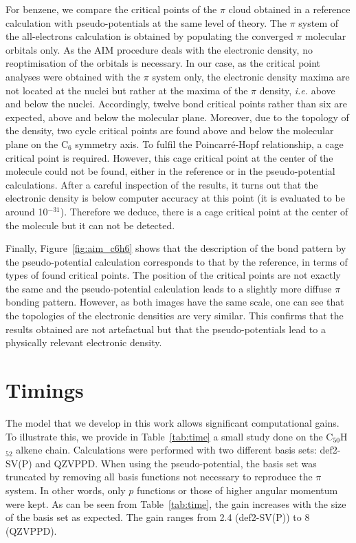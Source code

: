 \documentclass[12pt]{article}
\begin{document}
For benzene, we compare the critical points of the $\pi$ cloud obtained in a reference calculation
with pseudo-potentials at the same level of theory.
The $\pi$ system of the all-electrons calculation is obtained  by populating the converged $\pi$ molecular orbitals only.
As the AIM procedure deals with the electronic density, no reoptimisation of the orbitals is necessary.
In our case, as the critical point analyses were obtained
with the $\pi$ system only, the electronic density maxima are not
located at the nuclei but rather at the maxima of the $\pi$ density, 
\emph{i.e.} above and below the nuclei. %
Accordingly, twelve bond critical points rather than six are expected,
above and below the molecular plane.
Moreover, due to the topology of the density, two cycle critical points are found above and below the molecular
plane on the C$_6$ symmetry axis.
To fulfil the Poincarré-Hopf relationship, a cage critical point is required. However, this cage critical point 
at the center of the molecule could not be found, either in the reference or in the pseudo-potential 
calculations.
After a careful inspection of the results, it turns out that the electronic density
is below computer accuracy at this point (it is evaluated to be around 10$^{-31}$).
Therefore we deduce, there is a cage critical point at the center of
the molecule but it can not be detected.

Finally, Figure~\ref{fig:aim_c6h6} shows that the description of the bond pattern by the pseudo-potential
calculation corresponds to that by the reference, in terms of types of found critical points.
The position of the critical points are not exactly the same and the pseudo-potential calculation
leads to a slightly more diffuse $\pi$ bonding pattern.
However, as both images have the same scale, one can see that the topologies
of the electronic densities are very similar.
This confirms that the results obtained are not artefactual but that the pseudo-potentials
lead to a physically relevant electronic density.

\section*{\sffamily \large Timings}
The model that we develop in this work allows significant computational gains.
To illustrate this, we provide in Table~\ref{tab:time} a small study done on the C$_{50}$H$_{52}$
alkene chain.
Calculations were performed with two different basis sets: def2-SV(P) and QZVPPD.
When using the pseudo-potential, the basis set was truncated by removing all
basis functions not necessary to reproduce the
$\pi$ system.
In other words, only $p$ functions or those of higher angular momentum were kept.
As can be seen from Table~\ref{tab:time}, the gain increases
with the size of the basis set as expected.
The gain ranges from 2.4 (def2-SV(P)) to 8 (QZVPPD).
\end{document}
